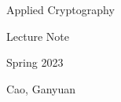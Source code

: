 \documentclass[11pt,a4paper]{article}
\begin{document}
\newpage
\begin{center}
\sc
\huge{Applied Cryptography} 

\vspace{0.5cm}
\Large{Lecture Note}

\vspace{0.5cm}
\large{Spring 2023}

\vspace{0.5cm}
\large{Cao, Ganyuan}
\vspace{1cm}
\end{center}

\tableofcontents








\end{document}
